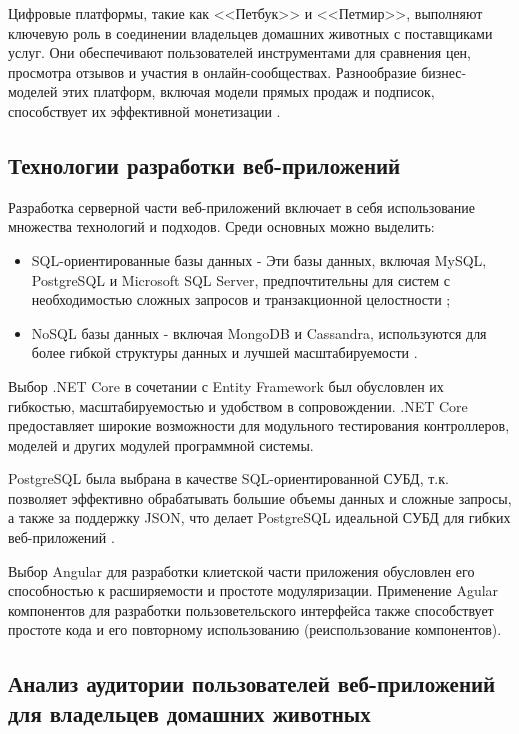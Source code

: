 Цифровые платформы, такие как <<Петбук>> и <<Петмир>>, выполняют ключевую роль в соединении владельцев домашних животных с поставщиками услуг. Они обеспечивают пользователей инструментами для сравнения цен, просмотра отзывов и участия в онлайн-сообществах. Разнообразие бизнес-моделей этих платформ, включая модели прямых продаж и подписок, способствует их эффективной монетизации \cite{market}.

\subsection{Технологии разработки веб-приложений}

Разработка серверной части веб-приложений включает в себя использование множества технологий и подходов. Среди основных можно выделить:

\begin{itemize}
  \item SQL-ориентированные базы данных -\- Эти базы данных, включая MySQL, PostgreSQL и Microsoft SQL Server, предпочтительны для систем с необходимостью сложных запросов и транзакционной целостности \cite{freedman};
  \item NoSQL базы данных -\- включая MongoDB и Cassandra, используются для более гибкой структуры данных и лучшей масштабируемости \cite{market}.
\end{itemize}

Выбор .NET Core в сочетании с Entity Framework был обусловлен их гибкостью, масштабируемостью и удобством в сопровождении. .NET Core предоставляет широкие возможности для модульного тестирования контроллеров, моделей и других модулей программной системы.

PostgreSQL была выбрана в качестве SQL-ориентированной СУБД, т.к. позволяет эффективно обрабатывать большие объемы данных и сложные запросы, а также за поддержку JSON, что делает PostgreSQL идеальной СУБД для гибких веб-приложений \cite{freedman}.

Выбор Angular для разработки клиетской части приложения обусловлен его способностью к расширяемости и простоте модуляризации. Применение Agular компонентов для разработки пользоветельского интерфейса также способствует простоте кода и его повторному использованию (реиспользование компонентов).

\subsection{Анализ аудитории пользователей веб-приложений для владельцев домашних животных}

